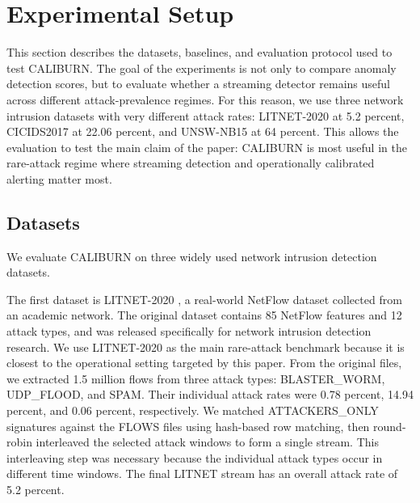 \documentclass[preprint,12pt,authoryear]{elsarticle}
\newcommand{\caliburn}{CALIBURN}
\begin{document}
\section{Experimental Setup}
\label{sec:experiments}

This section describes the datasets, baselines, and evaluation protocol used to test \caliburn{}. The goal of the experiments is not only to compare anomaly detection scores, but to evaluate whether a streaming detector remains useful across different attack-prevalence regimes. For this reason, we use three network intrusion datasets with very different attack rates: LITNET-2020 at 5.2 percent, CICIDS2017 at 22.06 percent, and UNSW-NB15 at 64 percent. This allows the evaluation to test the main claim of the paper: \caliburn{} is most useful in the rare-attack regime where streaming detection and operationally calibrated alerting matter most.

\subsection{Datasets}
\label{sec:exp-datasets}

We evaluate \caliburn{} on three widely used network intrusion detection datasets.

The first dataset is LITNET-2020 \citep{damasevicius2020litnet}, a real-world NetFlow dataset collected from an academic network. The original dataset contains 85 NetFlow features and 12 attack types, and was released specifically for network intrusion detection research. We use LITNET-2020 as the main rare-attack benchmark because it is closest to the operational setting targeted by this paper. From the original files, we extracted 1.5 million flows from three attack types: BLASTER\_WORM, UDP\_FLOOD, and SPAM. Their individual attack rates were 0.78 percent, 14.94 percent, and 0.06 percent, respectively. We matched ATTACKERS\_ONLY signatures against the FLOWS files using hash-based row matching, then round-robin interleaved the selected attack windows to form a single stream. This interleaving step was necessary because the individual attack types occur in different time windows. The final LITNET stream has an overall attack rate of 5.2 percent.
\end{document}

